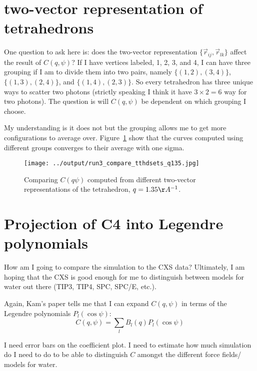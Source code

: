\documentclass[20pt]{article}
\begin{document}
\section{two-vector representation of tetrahedrons}
One question to ask here is: does the two-vector representation $\{\vec r_{ij},\vec r_{lk}\}$ affect the result of $C(q, \psi)$? If I have vertices labeled, 1, 2, 3, and 4, I can have three grouping if I am to divide them into two pairs, namely $\{(1, 2), (3, 4)\}$, $\{(1, 3), (2, 4)\}$, and $\{(1, 4), (2, 3)\}$. So every tetrahedron has three unique ways to scatter two photons (strictly speaking I think it have $3 \times 2 = 6$ way for two photons). The question is will $C(q, \psi)$ be dependent on which grouping I choose.

My understanding is it does not but the grouping allows me to get more configurations to average over. Figure~\ref{fig:tthdsets_compare} show that the curves computed using different groups converges to their average with one sigma.
\begin{figure}[!h] 
  \centering
    \texttt{[image: ../output/run3\_compare\_tthdsets\_q135.jpg]}
     \caption{Comparing $C(q \psi)$ computed from different two-vector representations of the tetrahedron, $q = 1.35 \AA^{-1}$.} \label{fig:tthdsets_compare}
\end{figure}

\section{Projection of C4 into Legendre polynomials}
How am I going to compare the simulation to the CXS data? Ultimately, I am hoping that the CXS is good enough for me to distinguish between models for water out there (TIP3, TIP4, SPC, SPC/E, etc.). 

Again, Kam's paper tells me that I can expand $C(q, \psi)$ in terms of the Legendre polynomials $P_l(\cos \psi)$:
\begin{equation}
C(q, \psi) = \sum_l B_l(q) P_l(\cos \psi)
\end{equation}

I need error bars on the coefficient plot. I need to estimate how much simulation do I need to do to be able to distinguish $C$ amongst the different force fields/ models for water.
\end{document}

